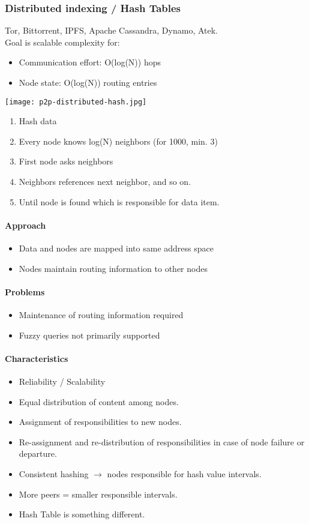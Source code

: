 \subsubsection{Distributed indexing / Hash Tables}
Tor, Bittorrent, IPFS, Apache Cassandra, Dynamo, Atek.\\

Goal is scalable complexity for:
\begin{itemize}
  \item Communication effort: O(log(N)) hops
  \item Node state: O(log(N)) routing entries
\end{itemize}

\texttt{[image: p2p-distributed-hash.jpg]}
\begin{enumerate}
  \item Hash data
  \item Every node knows log(N) neighbors (for 1000, min. 3)
  \item First node asks neighbors
  \item Neighbors references next neighbor, and so on.
  \item Until node is found which is responsible for data item.
\end{enumerate}

\paragraph{Approach}
\begin{itemize}
  \item Data and nodes are mapped into same address space
  \item Nodes maintain routing information to other nodes
\end{itemize}
\paragraph{Problems}
\begin{itemize}
  \item Maintenance of routing information required
  \item Fuzzy queries not primarily supported
\end{itemize}
\paragraph{Characteristics}
\begin{itemize}
  \item Reliability / Scalability
  \item Equal distribution of content among nodes.
  \item Assignment of responsibilities to new nodes.
  \item Re-assignment and re-distribution of responsibilities in case of node failure or departure.
  \item Consistent hashing $\rightarrow$ nodes responsible for hash value intervals.
  \item More peers = smaller responsible intervals.
  \item Hash Table is something different.
\end{itemize}

